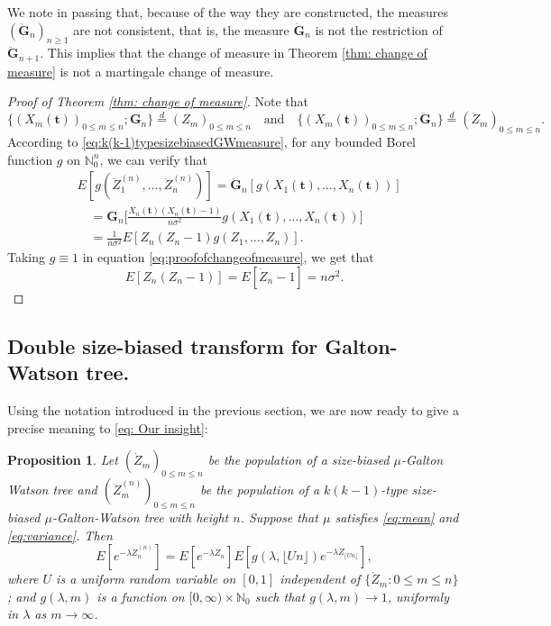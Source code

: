\documentclass[UTF8]{pkuthss}
\theoremstyle{plain}
\newtheorem{prop}[thm]{Proposition}
\theoremstyle{definition}
\numberwithin{equation}{section}
\begin{document}
We note in passing that, because of the way they are constructed, the measures $(\ddot{\mathbf G}_n)_{n\ge 1}$ are not consistent, that is, the measure $\ddot{\mathbf G}_n$ is not the restriction of $\ddot{\mathbf G}_{n+1}$.
This implies that the change of measure in Theorem \ref{thm: change of measure} is not a martingale change of measure.
\medskip
\begin{proof}[Proof of Theorem \ref{thm: change of measure}]
	Note that
	\[
	\{(X_m( \mathbf t ))_{0\le m\le n}; {\mathbf G}_n\}  \overset{d}{=} (Z_m)_{0\le m\le n}
	\quad    \mbox{and} \quad \{(X_m( \mathbf t ))_{0\le m\le n};\ddot{\mathbf G}_n\}  \overset{d}{=} (\ddot Z_m)_{0\le m\le n}.
	\]
	According to \eqref{eq:k(k-1)typesizebiasedGWmeasure}, for any bounded Borel function $g$ on $\mathbb N_0^n$, we can verify that
	\begin{equation} \label{eq:proofofchangeofmeasure}
	\begin{split}
	&E [ g ( \ddot Z_1^{(n)}, \dots, \ddot Z_n^{(n)})]
	= \ddot{\mathbf G}_n [g ( X_1(  \mathbf t ), \dots, X_n(  \mathbf t ))]
	\\ &\quad = {\mathbf G}_n \big[ \frac { X_n( \mathbf t ) ( X_n( \mathbf t ) - 1)} {n \sigma^2} g (X_1( \mathbf t ), \dots, X_n( \mathbf t ))\big]
	\\&\quad = \frac { 1} { n \sigma^2} E[ Z_n ( Z_n - 1) g( Z_1, \dots, Z_n)].
	\end{split}
	\end{equation}
	Taking $g\equiv 1$ in equation \eqref{eq:proofofchangeofmeasure}, we get that
	\begin{equation}
	\label{eq: second moment}
	E [Z_n(Z_n-1)]= E [\dot Z_n - 1]= n\sigma^2.
	\end{equation}
\end{proof}

\subsection{Double size-biased transform for Galton-Watson tree.}
\label{sec:spinesdecomposition}

	Using the notation introduced in the previous section, we are now ready to give a precise meaning to \eqref{eq: Our insight}:
\begin{prop}
\label{prop: size-biased add-on of size-biased tree }
	Let $(\dot Z_m)_{0 \leq m \leq n}$ be the population of a size-biased $\mu$-Galton Watson tree and $(\ddot Z^{(n)}_m)_{0 \leq m \leq n}$ be the population of a $k(k-1)$-type size-biased $\mu$-Galton-Watson tree with height $n$.
	Suppose that $\mu$ satisfies \eqref{eq:mean} and \eqref{eq:variance}.
	Then
\[
	E [ e^{- \lambda \ddot Z_n^{(n)}} ]
	 = E [e^{-\lambda \dot Z_n}] E[g(\lambda, \lfloor Un \rfloor )e^{-\lambda \dot Z_{ \lfloor Un \rfloor}}],
\]
	where $U$ is a uniform random variable on $[0,1]$ independent of $\{\dot Z_m: 0\le m\le n\}$;
	and $g(\lambda, m)$ is a function on $[0,\infty) \times \mathbb N_0$ such that
	$g(\lambda, m) \to 1$, uniformly in $\lambda$ as $m\to \infty$.
\end{prop}
\end{document}
